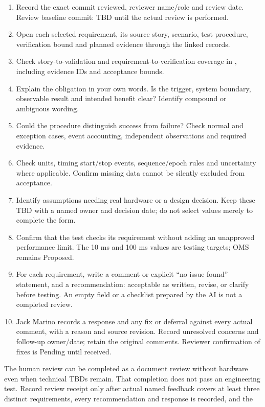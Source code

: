 \begin{enumerate}
\item Record the exact commit reviewed, reviewer name/role and review date.
Review baseline commit: TBD until the actual review is performed.
\item Open each selected requirement, its source story, scenario, test procedure,
verification bound and planned evidence through the linked records.
\item Check story-to-validation and requirement-to-verification coverage in
, including evidence IDs and acceptance bounds.
\item Explain the obligation in your own words. Is the trigger, system boundary,
observable result and intended benefit clear? Identify compound or ambiguous wording.
\item Could the procedure distinguish success from failure? Check normal and
exception cases, event accounting, independent observations and required evidence.
\item Check units, timing start/stop events, sequence/epoch rules and uncertainty
where applicable. Confirm missing data cannot be silently excluded from acceptance.
\item Identify assumptions needing real hardware or a design decision. Keep these
TBD with a named owner and decision date; do not select values merely to complete the form.
\item Confirm that the test checks its requirement without adding an unapproved
performance limit. The 10 ms and 100 ms values are testing targets; OMS remains Proposed.
\item For each requirement, write a comment or explicit ``no issue found'' statement,
and a recommendation: acceptable as written, revise, or clarify before testing.
An empty field or a checklist prepared by the AI is not a completed review.
\item Jack Marino records a response and any fix or deferral against every actual
comment, with a reason and source revision. Record unresolved concerns and follow-up
owner/date; retain the original comments. Reviewer confirmation of fixes is Pending
until received.
\end{enumerate}
The human review can be completed as a document review without hardware even
when technical TBDs remain. That completion does not pass an engineering test.
Record review receipt only after actual named feedback covers at least three
distinct requirements, every recommendation and response is recorded, and the
